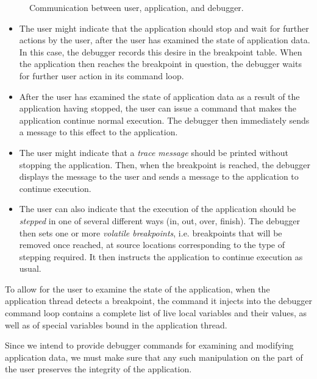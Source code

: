 \begin{figure}
\begin{center}
\end{center}
\caption{\label{fig-communication}
Communication between user, application, and debugger.}
\end{figure}

\begin{itemize}
\item The user might indicate that the application should stop and
  wait for further actions by the user, after the user has examined
  the state of application data.  In this case, the debugger records
  this desire in the breakpoint table.  When the application then
  reaches the breakpoint in question, the debugger waits for further
  user action in its command loop.
\item After the user has examined the state of application data as a
  result of the application having stopped, the user can issue a
  command that makes the application continue normal execution.  The
  debugger then immediately sends a message to this effect to the
  application.
\item The user might indicate that a \emph{trace message} should be
  printed without stopping the application.  Then, when the breakpoint
  is reached, the debugger displays the message to the user and sends
  a message to the application to continue execution.
\item The user can also indicate that the execution of the application
  should be \emph{stepped} in one of several different ways (in, out,
  over, finish).  The debugger then sets one or more \emph{volatile
    breakpoints}, i.e. breakpoints that will be removed once reached,
  at source locations corresponding to the type of stepping required.
  It then instructs the application to continue execution as usual.
\end{itemize}

To allow for the user to examine the state of the
application, when the application thread detects a breakpoint, the
command it injects into the debugger command loop contains a complete
list of live local variables and their values, as well as of special
variables bound in the application thread.

Since we intend to provide debugger commands for examining and
modifying application data, we must make sure that any such
manipulation on the part of the user preserves the integrity of the
application.


